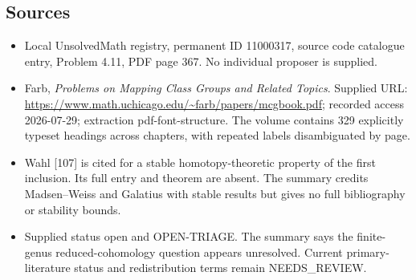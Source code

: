 \documentclass[11pt]{article}
\begin{document}
\subsection{Sources}
\begin{itemize}
\item Local UnsolvedMath registry, permanent ID 11000317, source code catalogue entry, Problem 4.11, PDF page 367. No individual proposer is supplied.
\item Farb, \emph{Problems on Mapping Class Groups and Related Topics}. Supplied URL: \url{https://www.math.uchicago.edu/~farb/papers/mcgbook.pdf}; recorded access 2026-07-29; extraction pdf-font-structure. The volume contains 329 explicitly typeset headings across chapters, with repeated labels disambiguated by page.
\item Wahl [107] is cited for a stable homotopy-theoretic property of the first inclusion. Its full entry and theorem are absent. The summary credits Madsen--Weiss and Galatius with stable results but gives no full bibliography or stability bounds.
\item Supplied status open and OPEN-TRIAGE. The summary says the finite-genus reduced-cohomology question appears unresolved. Current primary-literature status and redistribution terms remain NEEDS\_REVIEW.
\end{itemize}
\end{document}
